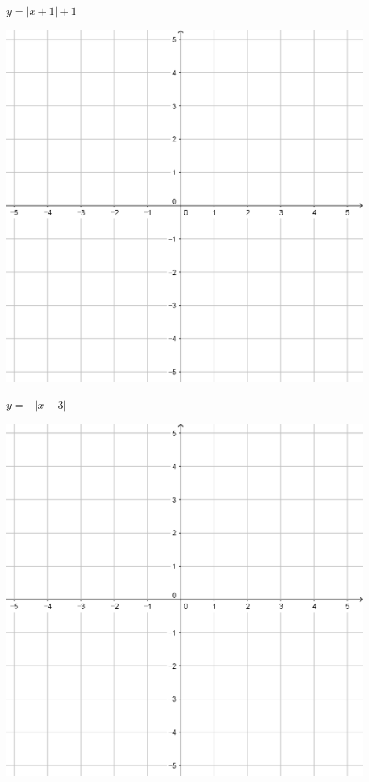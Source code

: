 \documentclass[a4paper]{oblivoir}
\begin{document}
\begin{minipage}{0.45\textwidth}\centering
\(y=|x+1|+1\)
\par\bigskip\includegraphics[width=0.9\textwidth]{55}
\end{minipage}
\begin{minipage}{0.45\textwidth}\centering
\(y=-|x-3|\)
\par\bigskip\includegraphics[width=0.9\textwidth]{55}
\end{minipage}\bigskip\bigskip\par
\end{document}
